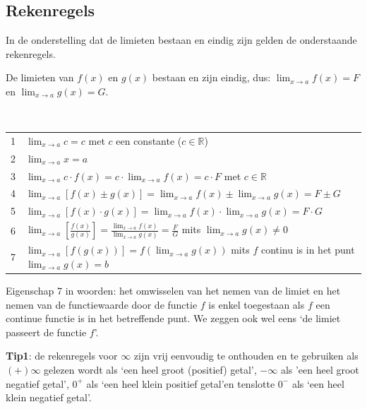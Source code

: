 \subsection{Rekenregels}

In de onderstelling dat de limieten bestaan en eindig zijn gelden
de onderstaande rekenregels.

De limieten van $f(x)$ en $g(x)$ bestaan en zijn eindig,
dus: $\lim_{x\to a}f(x)=F$ en $\lim_{x\to a}g(x)=G$.

\begin{ftrekenregel}
	\ 
	\begin{tabel*}{}
	\centering
	\begin{tabular}{ll}

		1 & $\lim_{x\to a}c=c$ met $c$ een constante ($c\in\mathbb{R}$)\\

		2 & $\lim_{x\to a}x=a$  \\

		3 & $\lim_{x\to a}c\cdot f(x)=c\cdot \lim_{x\to a}f(x)=c\cdot F$  met $c\in\mathbb{R}$\\

		4 & $\lim_{x\to a}\left[f(x)\pm g(x)\right]=\lim_{x\to a}f(x)\pm\lim_{x\to a}g(x)=F\pm G$  \\

		5 & $\lim_{x\to a}\left[f(x)\cdot g(x)\right]=\lim_{x\to a}f(x)\cdot \lim_{x\to a}g(x)=F\cdot G$  \\

		6 & $\lim_{x\to a}\left[\frac{f(x)}{g(x)}\right]=\frac{\lim_{x\to a}f(x)}{\lim_{x\to a}g(x)}=\frac{F}{G}$  mits $\lim_{x\to a}g(x)\neq0$\\

		7 & $\lim_{x\to a}\left[f\left(g(x)\right)\right]=f\left(\lim_{x\to a}g(x)\right)$  mits $f$ continu is in het punt $\lim_{x\to a}g(x)=b$ \\


	\end{tabular}
\end{tabel*}
\end{ftrekenregel}

Eigenschap 7 in woorden: het omwisselen van het nemen van
de limiet en het nemen van de functiewaarde door de functie $f$ is
enkel toegestaan als $f$ een continue functie is in het betreffende
punt. We zeggen ook wel eens \textquoteleft de limiet passeert de functie $f$\textquoteright.

\textbf{Tip1}: de rekenregels voor $\infty$ zijn vrij eenvoudig
te onthouden en te gebruiken als $(+)\infty$ gelezen wordt als \textquoteleft een
heel groot (positief) getal\textquoteright, $-\infty$ als 'een heel groot negatief
getal', $0^{+}$ als \textquoteleft een heel klein positief getal\textquoteright en tenslotte $0^{-}$
als \textquoteleft een heel klein negatief getal\textquoteright.

